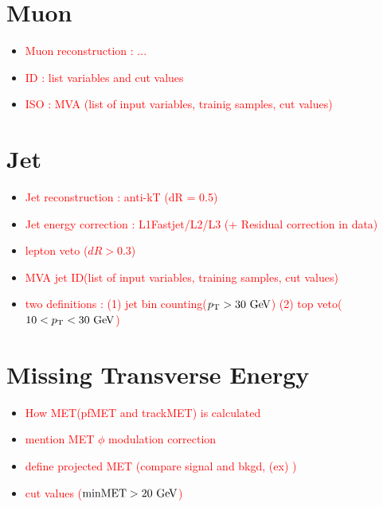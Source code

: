 
\section{ Muon }
\begin{itemize}
\item \textcolor{red}{Muon reconstruction : ...}
\item \textcolor{red}{ID  : list variables and cut values }
\item \textcolor{red}{ISO : MVA (list of input variables, trainig samples, cut values) }
\end{itemize}

\section{ Jet }
\begin{itemize}
\item \textcolor{red}{Jet reconstruction : anti-kT (dR = 0.5) }
\item \textcolor{red}{Jet energy correction : L1Fastjet/L2/L3 (+ Residual correction in data) }
\item \textcolor{red}{lepton veto ($dR>0.3$) }
\item \textcolor{red}{MVA jet ID(list of input variables, training samples, cut values)}
\item \textcolor{red}{two definitions : (1) jet bin counting($p_\mathrm{T}>30~\mathrm{Ge\kern -0.1em V}$) (2) top veto($10<p_\mathrm{T}<30~\mathrm{Ge\kern -0.1em V}$) }
\end{itemize}

\section{ Missing Transverse Energy }
\begin{itemize}
\item \textcolor{red}{How MET(pfMET and trackMET) is calculated } 
\item \textcolor{red}{mention MET $\phi$ modulation correction }
\item \textcolor{red}{define projected MET (compare signal and bkgd, (ex) \ztt)}
\item \textcolor{red}{cut values ($\textrm{minMET} > 20~\mathrm{Ge\kern -0.1em V}$) }
\end{itemize}

